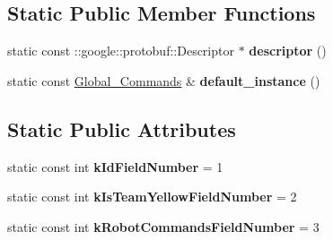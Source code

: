 \subsection*{Static Public Member Functions}
\begin{DoxyCompactItemize}
\item 
static const \+::google\+::protobuf\+::\+Descriptor $\ast$ {\bfseries descriptor} ()\hypertarget{classvss__command_1_1Global__Commands_a26e4245a80fa599d0e30613122af7ad9}{}\label{classvss__command_1_1Global__Commands_a26e4245a80fa599d0e30613122af7ad9}

\item 
static const \hyperlink{classvss__command_1_1Global__Commands}{Global\+\_\+\+Commands} \& {\bfseries default\+\_\+instance} ()\hypertarget{classvss__command_1_1Global__Commands_a9e44db388aae4a529e0bff71979eea66}{}\label{classvss__command_1_1Global__Commands_a9e44db388aae4a529e0bff71979eea66}

\end{DoxyCompactItemize}
\subsection*{Static Public Attributes}
\begin{DoxyCompactItemize}
\item 
static const int {\bfseries k\+Id\+Field\+Number} = 1\hypertarget{classvss__command_1_1Global__Commands_a67c9ce208f0648844211d1faca128e34}{}\label{classvss__command_1_1Global__Commands_a67c9ce208f0648844211d1faca128e34}

\item 
static const int {\bfseries k\+Is\+Team\+Yellow\+Field\+Number} = 2\hypertarget{classvss__command_1_1Global__Commands_a90443d587b7a5171b061ec96660b04ef}{}\label{classvss__command_1_1Global__Commands_a90443d587b7a5171b061ec96660b04ef}

\item 
static const int {\bfseries k\+Robot\+Commands\+Field\+Number} = 3\hypertarget{classvss__command_1_1Global__Commands_a65b203ec091ad5cce5fcb7b34b01bcf1}{}\label{classvss__command_1_1Global__Commands_a65b203ec091ad5cce5fcb7b34b01bcf1}

\end{DoxyCompactItemize}
